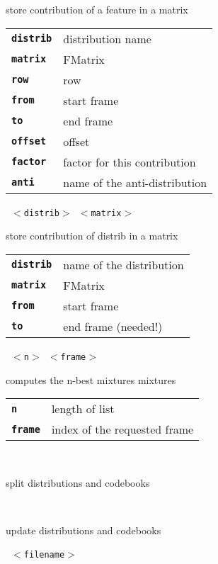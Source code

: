 \begin{description}
\begin{description}
        store contribution of a feature in a matrix

      \begin{tabular}{ll}
 \texttt{\textbf{distrib}} &  distribution name \\
 \texttt{\textbf{matrix}} &   FMatrix \\
 \texttt{\textbf{row}} &       row  \\
 \texttt{\textbf{from}} &      start frame  \\
 \texttt{\textbf{to}} &        end frame  \\
 \texttt{\textbf{offset}} &    offset  \\
 \texttt{\textbf{factor}} &    factor for this contribution  \\
 \texttt{\textbf{anti}} &      name of the anti-distribution \\
      \end{tabular}
       \texttt{ $<$distrib$>$ $<$matrix$>$  } \

        store contribution of distrib in a matrix

      \begin{tabular}{ll}
 \texttt{\textbf{distrib}} &  name of the distribution \\
 \texttt{\textbf{matrix}} &   FMatrix \\
 \texttt{\textbf{from}} &      start frame  \\
 \texttt{\textbf{to}} &        end frame (needed!)  \\
      \end{tabular}
       \texttt{ $<$n$>$ $<$frame$>$} \

        computes the n-best mixtures mixtures

      \begin{tabular}{ll}
 \texttt{\textbf{n}} &      length of list  \\
 \texttt{\textbf{frame}} &  index of the requested frame  \\
      \end{tabular}
       \texttt{} \

        split distributions and codebooks

       \texttt{} \

        update distributions and codebooks

       \texttt{ $<$filename$>$} \


\end{description}
\end{description}
